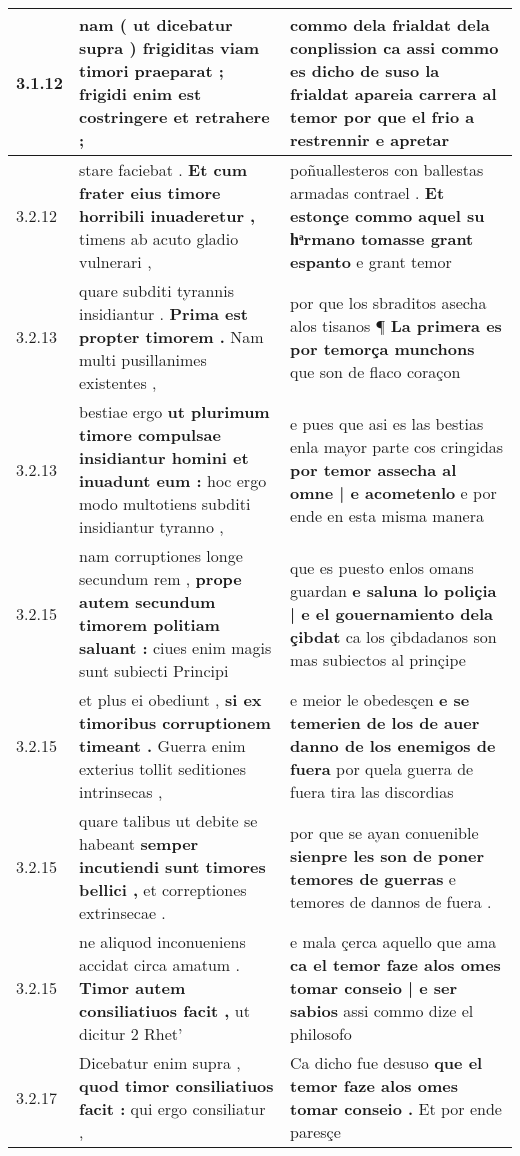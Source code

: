 \begin{tabular}{|p{1cm}|p{6.5cm}|p{6.5cm}|}
3.1.12 & nam ( ut dicebatur supra ) \textbf{ frigiditas viam timori praeparat ; } frigidi enim est costringere et retrahere ; & commo dela frialdat dela conplission \textbf{ ca assi commo es dicho de suso la frialdat apareia carrera al temor } por que el frio a restrennir e apretar \\\hline
3.2.12 & stare faciebat . \textbf{ Et cum frater eius timore horribili inuaderetur , } timens ab acuto gladio vulnerari , & poñuallesteros con ballestas armadas contrael . \textbf{ Et estonçe commo aquel su hͣrmano tomasse grant espanto } e grant temor \\\hline
3.2.13 & quare subditi tyrannis insidiantur . \textbf{ Prima est propter timorem . } Nam multi pusillanimes existentes , & por que los sbraditos asecha alos tisanos ¶ \textbf{ La primera es por temorça munchons } que son de flaco coraçon \\\hline
3.2.13 & bestiae ergo \textbf{ ut plurimum timore compulsae insidiantur homini et inuadunt eum : } hoc ergo modo multotiens subditi insidiantur tyranno , & e pues que asi es las bestias enla mayor parte cos cringidas \textbf{ por temor assecha al omne | e acometenlo } e por ende en esta misma manera \\\hline
3.2.15 & nam corruptiones longe secundum rem , \textbf{ prope autem secundum timorem politiam saluant : } ciues enim magis sunt subiecti Principi & que es puesto enlos omans guardan \textbf{ e saluna lo poliçia | e el gouernamiento dela çibdat } ca los çibdadanos son mas subiectos al prinçipe \\\hline
3.2.15 & et plus ei obediunt , \textbf{ si ex timoribus corruptionem timeant . } Guerra enim exterius tollit seditiones intrinsecas , & e meior le obedesçen \textbf{ e se temerien de los de auer danno de los enemigos de fuera } por quela guerra de fuera tira las discordias \\\hline
3.2.15 & quare talibus ut debite se habeant \textbf{ semper incutiendi sunt timores bellici , } et correptiones extrinsecae . & por que se ayan conuenible \textbf{ sienpre les son de poner temores de guerras } e temores de dannos de fuera . \\\hline
3.2.15 & ne aliquod inconueniens accidat circa amatum . \textbf{ Timor autem consiliatiuos facit , } ut dicitur 2 Rhet’ & e mala çerca aquello que ama \textbf{ ca el temor faze alos omes tomar conseio | e ser sabios } assi commo dize el philosofo \\\hline
3.2.17 & Dicebatur enim supra , \textbf{ quod timor consiliatiuos facit : } qui ergo consiliatur , & Ca dicho fue desuso \textbf{ que el temor faze alos omes tomar conseio . } Et por ende paresçe \\\hline

\end{tabular}

